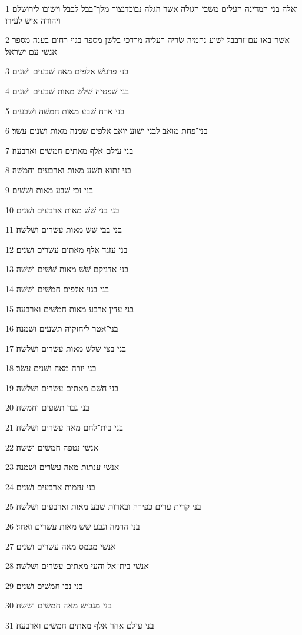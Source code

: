 \par 1 ואלה בני המדינה העלים משׁבי הגולה אשׁר הגלה נבוכדנצור מלך־בבל לבבל וישׁובו לירושׁלם ויהודה אישׁ לעירו׃
\par 2 אשׁר־באו עם־זרבבל ישׁוע נחמיה שׂריה רעליה מרדכי בלשׁן מספר בגוי רחום בענה מספר אנשׁי עם ישׂראל׃
\par 3 בני פרעשׁ אלפים מאה שׁבעים ושׁנים׃
\par 4 בני שׁפטיה שׁלשׁ מאות שׁבעים ושׁנים׃
\par 5 בני ארח שׁבע מאות חמשׁה ושׁבעים׃
\par 6 בני־פחת מואב לבני ישׁוע יואב אלפים שׁמנה מאות ושׁנים עשׂר׃
\par 7 בני עילם אלף מאתים חמשׁים וארבעה׃
\par 8 בני זתוא תשׁע מאות וארבעים וחמשׁה׃
\par 9 בני זכי שׁבע מאות ושׁשׁים׃
\par 10 בני בני שׁשׁ מאות ארבעים ושׁנים׃
\par 11 בני בבי שׁשׁ מאות עשׂרים ושׁלשׁה׃
\par 12 בני עזגד אלף מאתים עשׂרים ושׁנים׃
\par 13 בני אדניקם שׁשׁ מאות שׁשׁים ושׁשׁה׃
\par 14 בני בגוי אלפים חמשׁים ושׁשׁה׃
\par 15 בני עדין ארבע מאות חמשׁים וארבעה׃
\par 16 בני־אטר ליחזקיה תשׁעים ושׁמנה׃
\par 17 בני בצי שׁלשׁ מאות עשׂרים ושׁלשׁה׃
\par 18 בני יורה מאה ושׁנים עשׂר׃
\par 19 בני חשׁם מאתים עשׂרים ושׁלשׁה׃
\par 20 בני גבר תשׁעים וחמשׁה׃
\par 21 בני בית־לחם מאה עשׂרים ושׁלשׁה׃
\par 22 אנשׁי נטפה חמשׁים ושׁשׁה׃
\par 23 אנשׁי ענתות מאה עשׂרים ושׁמנה׃
\par 24 בני עזמות ארבעים ושׁנים׃
\par 25 בני קרית ערים כפירה ובארות שׁבע מאות וארבעים ושׁלשׁה׃
\par 26 בני הרמה וגבע שׁשׁ מאות עשׂרים ואחד׃
\par 27 אנשׁי מכמס מאה עשׂרים ושׁנים׃
\par 28 אנשׁי בית־אל והעי מאתים עשׂרים ושׁלשׁה׃
\par 29 בני נבו חמשׁים ושׁנים׃
\par 30 בני מגבישׁ מאה חמשׁים ושׁשׁה׃
\par 31 בני עילם אחר אלף מאתים חמשׁים וארבעה׃
